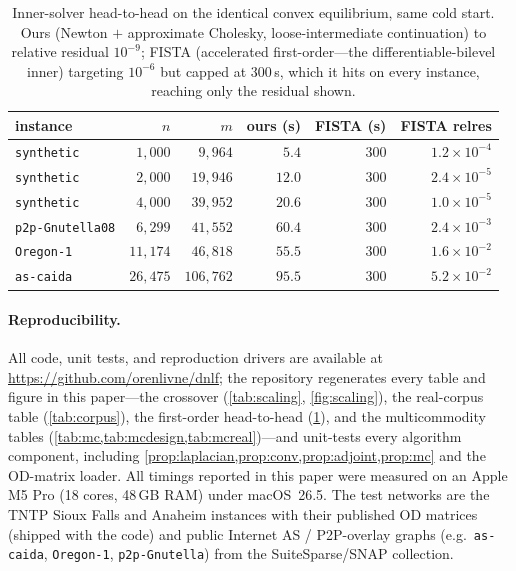 \documentclass[ijoc]{informs3}
\begin{document}
\begin{table}[t]\centering
\caption{Inner-solver head-to-head on the identical convex equilibrium, same cold start. Ours (Newton $+$
approximate Cholesky, loose-intermediate continuation) to relative residual $10^{-9}$; FISTA (accelerated
first-order---the differentiable-bilevel inner) targeting $10^{-6}$ but capped at $300$\,s, which it hits on
every instance, reaching only the residual shown.}
\label{tab:baseline}
\begin{tabular}{lrrrrr}\toprule
instance & $n$ & $m$ & ours (s) & FISTA (s) & FISTA relres\\\midrule
\texttt{synthetic}      & $1{,}000$  & $9{,}964$   & $5.4$  & $300$ & $1.2\times10^{-4}$\\
\texttt{synthetic}      & $2{,}000$  & $19{,}946$  & $12.0$ & $300$ & $2.4\times10^{-5}$\\
\texttt{synthetic}      & $4{,}000$  & $39{,}952$  & $20.6$ & $300$ & $1.0\times10^{-5}$\\
\texttt{p2p-Gnutella08} & $6{,}299$  & $41{,}552$  & $60.4$ & $300$ & $2.4\times10^{-3}$\\
\texttt{Oregon-1}       & $11{,}174$ & $46{,}818$  & $55.5$ & $300$ & $1.6\times10^{-2}$\\
\texttt{as-caida}       & $26{,}475$ & $106{,}762$ & $95.5$ & $300$ & $5.2\times10^{-2}$\\
\end{tabular}
\end{table}

\paragraph{Reproducibility.}
All code, unit tests, and reproduction drivers are available at \url{https://github.com/orenlivne/dnlf}; the
repository regenerates every table and figure in this paper---the crossover (\cref{tab:scaling},
\cref{fig:scaling}), the real-corpus table (\cref{tab:corpus}), the first-order head-to-head
(\cref{tab:baseline}), and the multicommodity tables (\cref{tab:mc,tab:mcdesign,tab:mcreal})---and unit-tests
every algorithm component, including \cref{prop:laplacian,prop:conv,prop:adjoint,prop:mc} and the OD-matrix
loader. All timings reported in this paper were measured on an Apple M5 Pro (18 cores, 48\,GB RAM) under
macOS~26.5. The test networks are the TNTP Sioux Falls and Anaheim instances with their published
OD matrices (shipped with the code) and public Internet AS / P2P-overlay graphs (e.g.\ \texttt{as-caida},
\texttt{Oregon-1}, \texttt{p2p-Gnutella}) from the SuiteSparse/SNAP collection.
\end{document}
